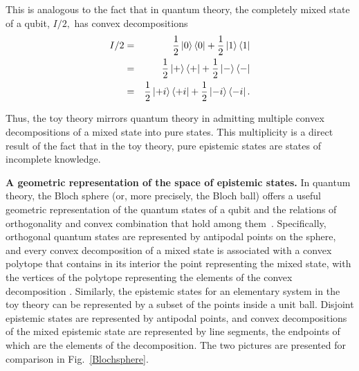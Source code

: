 \documentclass[pra,nofootinbib,showpacs,12pt]{revtex4}
\begin{document}
This is analogous to the fact that in quantum theory, the completely mixed
state of a qubit, $I/2,$ has convex decompositions
\begin{eqnarray}
I/2 &=&\frac{1}{2}\left| 0\right\rangle \left\langle 0\right| +\frac{1}{2}
\left| 1\right\rangle \left\langle 1\right|  \notag \\
&=&\frac{1}{2}\left| +\right\rangle \left\langle +\right| +\frac{1}{2}\left|
-\right\rangle \left\langle -\right|  \notag \\
&=&\frac{1}{2}\left| +i\right\rangle \left\langle +i\right| +\frac{1}{2}
\left| -i\right\rangle \left\langle -i\right| .
\end{eqnarray}

Thus, the toy theory mirrors quantum theory in admitting multiple convex
decompositions of a mixed state into pure states. This multiplicity is a
direct result of the fact that in the toy theory, pure epistemic states are
states of incomplete knowledge.

\textbf{A geometric representation of the space of epistemic states.} In
quantum theory, the Bloch sphere (or, more precisely, the Bloch ball) offers
a useful geometric representation of the quantum states of a qubit and the
relations of orthogonality and convex combination that hold among them~\cite%
{NielsenChuang}. Specifically, orthogonal quantum states are represented by
antipodal points on the sphere, and every convex decomposition of a mixed
state is associated with a convex polytope that contains in its interior the
point representing the mixed state, with the vertices of the polytope
representing the elements of the convex decomposition \cite%
{SpekkensRudolphQIC}. Similarly, the epistemic states for an elementary
system in the toy theory can be represented by a subset of the points inside
a unit ball. Disjoint epistemic states are represented by antipodal points,
and convex decompositions of the mixed epistemic state are represented by
line segments, the endpoints of which are the elements of the decomposition.
The two pictures are presented for comparison in Fig.~\ref{Blochsphere}.
\end{document}
